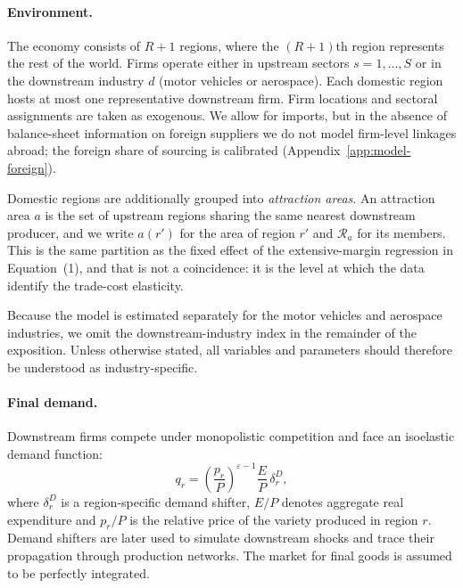 \paragraph{Environment.} The economy consists of $R+1$ regions, where the $(R+1)$th region
represents the rest of the world. Firms operate either in upstream sectors $s=1,\dots,S$ or in
the downstream industry $d$ (motor vehicles or aerospace). Each domestic region hosts at most
one representative downstream firm. Firm locations and sectoral assignments are taken as
exogenous. We allow for imports, but in the absence of balance-sheet information on foreign
suppliers we do not model firm-level linkages abroad; the foreign share of sourcing is
calibrated (Appendix~\ref{app:model-foreign}).

Domestic regions are additionally grouped into \emph{attraction areas}. An attraction area $a$
is the set of upstream regions sharing the same nearest downstream producer, and we write
$a(r')$ for the area of region $r'$ and $\mathcal{R}_{a}$ for its members. This is the same
partition as the fixed effect of the extensive-margin regression in Equation~(1), and that is
not a coincidence: it is the level at which the data identify the trade-cost elasticity.

Because the model is estimated separately for the motor vehicles and aerospace industries, we
omit the downstream-industry index in the remainder of the exposition. Unless otherwise stated,
all variables and parameters should therefore be understood as industry-specific.

\paragraph{Final demand.} Downstream firms compete under monopolistic competition and face an
isoelastic demand function:
\begin{equation}
q_{r}=\left(\frac{p_{r}}{P}\right)^{\varepsilon-1}\frac{E}{P}\,\delta^{D}_{r},
\end{equation}
where $\delta^{D}_{r}$ is a region-specific demand shifter, $E/P$ denotes aggregate real
expenditure and $p_{r}/P$ is the relative price of the variety produced in region $r$. Demand
shifters are later used to simulate downstream shocks and trace their propagation through
production networks. The market for final goods is assumed to be perfectly integrated.

